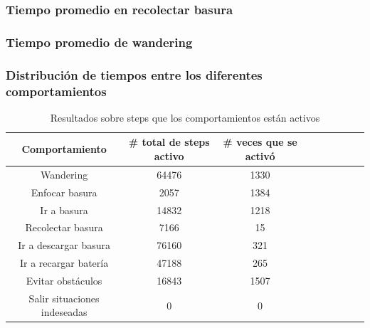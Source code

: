 \subsubsection{Tiempo promedio en recolectar basura}

\subsubsection{Tiempo promedio de wandering}

\subsubsection{Distribuci\'on de tiempos entre los diferentes comportamientos}

\begin{table}[ht]
	\begin{center}
		\begin{tabular}{|c|c|c|c|c|c|c|c|c|}
			\hline
			Comportamiento & \# total de steps activo & \# veces que se activ\'o \\
			\hline
			Wandering & 64476 & 1330 \\
			Enfocar basura & 2057 & 1384 \\
			Ir a basura & 14832 & 1218 \\
			Recolectar basura & 7166 & 15 \\
			Ir a descargar basura & 76160 & 321 \\
			Ir a recargar bater\'ia & 47188 & 265 \\
			Evitar obst\'aculos & 16843 & 1507 \\
			Salir situaciones indeseadas & 0 & 0 \\
			\hline
		\end{tabular}
	\end{center}
	\caption{Resultados sobre steps que los comportamientos est\'an activos }
	\label{behaviours_stats}
\end{table}

